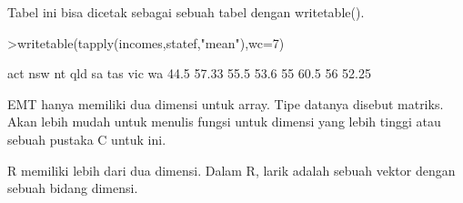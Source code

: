 \documentclass{article}
\begin{document}
\begin{eulernotebook}
\begin{eulercomment}
Tabel ini bisa dicetak sebagai sebuah tabel dengan writetable().
\end{eulercomment}
\begin{eulerprompt}
>writetable(tapply(incomes,statef,"mean"),wc=7)
\end{eulerprompt}
\begin{euleroutput}
      act    nsw     nt    qld     sa    tas    vic     wa
     44.5  57.33   55.5   53.6     55   60.5     56  52.25
\end{euleroutput}
\begin{eulercomment}
EMT hanya memiliki dua dimensi untuk array. Tipe datanya disebut
matriks. Akan lebih mudah untuk menulis fungsi untuk dimensi yang
lebih tinggi atau sebuah pustaka C untuk ini.

R memiliki lebih dari dua dimensi. Dalam R, larik adalah sebuah vektor
dengan sebuah bidang dimensi.


\end{eulercomment}
\end{eulernotebook}
\end{document}
